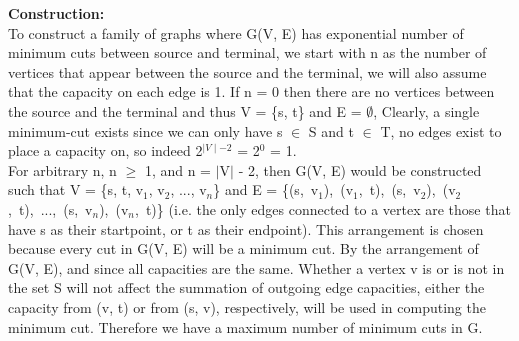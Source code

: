 \documentclass[10pt]{csc_assignment}
\begin{document}
\begin{description}

\newpage
\item[Q1.]

\textbf{Construction:}\\
To construct a family of graphs where G(V, E) has exponential number of minimum
cuts between source and terminal, we start with n as the number of vertices 
that appear between the source and the terminal, we will also assume that the capacity 
on each edge is 1. If n = 0 then there are no vertices between the source and the 
terminal and thus V = \{s, t\} and E = $\emptyset$, Clearly, a 
single minimum-cut exists since we can only have s $\in$ S and t $\in$ T, no edges exist to place a capacity on, so indeed 2$^{\mid V \mid - 2}$ = 2$^{0}$ = 1.\\ 

For arbitrary n, n $\geqslant$ 1, and n = $\mid$V$\mid$ - 2, then G(V, E) would be constructed such that V = 
\{s, t, v$_{1}$, v$_{2}$, ..., v$_{n}$\} and E = \mbox{\{(s, v$_{1}$), (v$_{1}$, t), (s, v$_{2}$), (v$_{2}$, t), ..., (s, v$_{n}$), (v$_{n}$, t)\}} (i.e. the only edges connected to a vertex are those that have s as their startpoint, or t as their endpoint). This arrangement is chosen because every cut in G(V, E) will be a minimum cut. By the arrangement of G(V, E), and since all capacities are the same. Whether a vertex v is or is not in the set S will not affect the summation of outgoing edge capacities, either the capacity from (v, t) or from (s, v), respectively, will be used in computing the minimum cut. Therefore we have a maximum number of minimum cuts in G.\\ 


\end{description}
\end{document}
